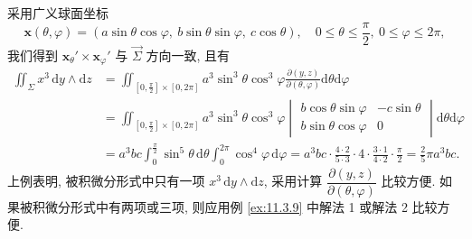 \begin{solution}
采用广义球面坐标
\[
\boldsymbol{x}(\theta,\varphi)=(a\sin\theta\cos\varphi,\ b\sin\theta\sin\varphi,\ c\cos\theta),\quad0\leqslant\theta\leqslant\frac{\pi}{2},\ 0\leqslant\varphi\leqslant2\pi,
\]
我们得到 $\boldsymbol{x}_{\theta}'\times\boldsymbol{x}_{\varphi}'$ 与 $\vec{\Sigma}$ 方向一致, 且有
\[
\begin{aligned}
\iint_{\Sigma}x^{3}\,\mathrm{d}y\wedge\mathrm{d}z&=\iint_{[0,\frac{\pi}{2}]\times[0,2\pi]}a^{3}\sin^{3}\theta\cos^{3}\varphi\frac{\partial(y,z)}{\partial(\theta,\varphi)}\mathrm{d}\theta\mathrm{d}\varphi\\
&=\iint_{[0,\frac{\pi}{2}]\times[0,2\pi]}a^{3}\sin^{3}\theta\cos^{3}\varphi
\begin{vmatrix}
b\cos\theta\sin\varphi&-c\sin\theta\\
b\sin\theta\cos\varphi&0
\end{vmatrix}\mathrm{d}\theta\mathrm{d}\varphi\\
&=a^{3}bc\int_{0}^{\frac{\pi}{2}}\sin^{5}\theta\,\mathrm{d}\theta\int_{0}^{2\pi}\cos^{4}\varphi\,\mathrm{d}\varphi=a^{3}bc\cdot\frac{4\cdot2}{5\cdot3}\cdot4\cdot\frac{3\cdot1}{4\cdot2}\cdot\frac{\pi}{2}=\frac{2}{5}\pi a^{3}bc.
\end{aligned}
\]
上例表明, 被积微分形式中只有一项 $x^{3}\,\mathrm{d}y\wedge\mathrm{d}z$, 采用计算 $\dfrac{\partial(y,z)}{\partial(\theta,\varphi)}$ 比较方便. 如果被积微分形式中有两项或三项, 则应用例 \ref{ex:11.3.9} 中解法 1 或解法 2 比较方便.
\end{solution}

